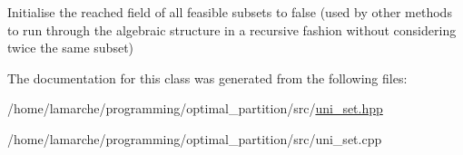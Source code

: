 Initialise the {\ttfamily reached} field of all feasible subsets to {\ttfamily false} (used by other methods to run through the algebraic structure in a recursive fashion without considering twice the same subset) 

The documentation for this class was generated from the following files\-:\begin{DoxyCompactItemize}
\item 
/home/lamarche/programming/optimal\-\_\-partition/src/\hyperlink{uni__set_8hpp}{uni\-\_\-set.\-hpp}\item 
/home/lamarche/programming/optimal\-\_\-partition/src/uni\-\_\-set.\-cpp\end{DoxyCompactItemize}
